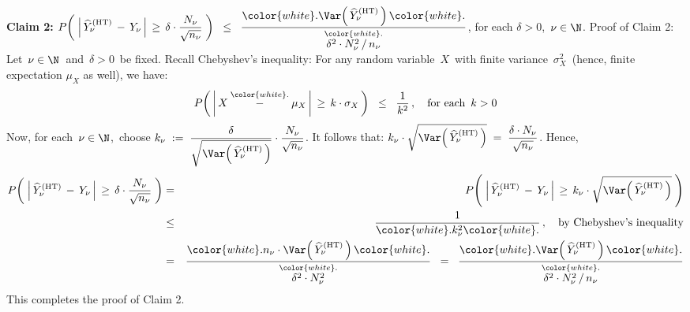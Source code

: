 \vskip 0.5cm
\noindent
\textbf{Claim 2:}\quad
$
P\!\left(\;
    \left\vert\,\widehat{Y}^{\textnormal{(HT)}}_{\nu}\,-\,Y_{\nu}\,\right\vert
    \,\geq\,
    \delta\cdot\dfrac{N_{\nu}}{\sqrt{n_{\nu}}}
    \;\right)
\;\;\leq\;\;
    \dfrac{
        {\color{white}.}
        \Var\!\left(\,\widehat{Y}_{\nu}^{\textnormal{(HT)}}\,\right)
        {\color{white}.}
        }{
        \overset{{\color{white}.}}{\delta^{2} \cdot N_{\nu}^{2}\,\slash\,n_{\nu}}
        }
$,\;\;
for each $\delta > 0$,\, $\nu\in\N$.
\vskip 0.2cm
\noindent
Proof of Claim 2:\;\;
Let \,$\nu\in\N$\, and \,$\delta > 0$\, be fixed. 
Recall Chebyshev's inequality:
For any random variable \,$X$\, with finite variance \,$\sigma_{X}^{2}$\,
(hence, finite expectation $\mu_{X}$ as well), we have:
\begin{equation*}
P\!\left(\,
    \left\vert\,X \overset{{\color{white}.}}{-} \mu_{X}\,\right\vert
    \,\geq\,
    k\cdot\sigma_{X}
    \,\right)
\;\; \leq \;\;
    \dfrac{1}{k^{2}}\,,
\quad
\textnormal{for each \,$k > 0$}
\end{equation*}
Now, for each \,$\nu \in \N$,\, choose
\;$
k_{\nu}
\; := \;
    \dfrac{\delta}{\sqrt{\Var\!\left(\,\widehat{Y}^{\textnormal{(HT)}}_{\nu}\,\right)}}
    \cdot
    \dfrac{N_{\nu}}{\sqrt{n_{\nu}}}
$.\;
It follows that:
\;$
k_{\nu}\cdot\sqrt{\Var\!\left(\,\widehat{Y}^{\textnormal{(HT)}}_{\nu}\,\right)}
\; = \;
    \dfrac{\delta \cdot N_{\nu}}{\sqrt{n_{\nu}}}
$.\;
Hence,
\begin{eqnarray*}
P\!\left(\;
    \left\vert\,\widehat{Y}^{\textnormal{(HT)}}_{\nu}\,-\,Y_{\nu}\,\right\vert
    \,\geq\,
    \delta\cdot\dfrac{N_{\nu}}{\sqrt{n_{\nu}}}
    \;\right)
& = &
    P\!\left(\;
        \left\vert\,\widehat{Y}^{\textnormal{(HT)}}_{\nu}\,-\,Y_{\nu}\,\right\vert
        \,\geq\,
        k_{\nu}\cdot\sqrt{\Var\!\left(\,\widehat{Y}^{\textnormal{(HT)}}_{\nu}\,\right)}
        \;\right)
\\
& \leq &
    \dfrac{1}{{\color{white}.}k_{\nu}^{2}{\color{white}.}}\,,
    \quad
    \textnormal{by Chebyshev's inequality}
\\
& = &
    \dfrac{
        {\color{white}.}
        n_{\nu} \cdot \Var\!\left(\,\widehat{Y}^{\textnormal{(HT)}}_{\nu}\,\right)
        {\color{white}.}
        }{
        \overset{{\color{white}.}}{\delta^{2} \cdot N_{\nu}^{2}}
        }
\;\; = \;\;
    \dfrac{
        {\color{white}.}
        \Var\!\left(\,\widehat{Y}^{\textnormal{(HT)}}_{\nu}\,\right)
        {\color{white}.}
        }{
        \overset{{\color{white}.}}{\delta^{2} \cdot N_{\nu}^{2} \,\slash\, n_{\nu}}
        }
\end{eqnarray*}
This completes the proof of Claim 2.

